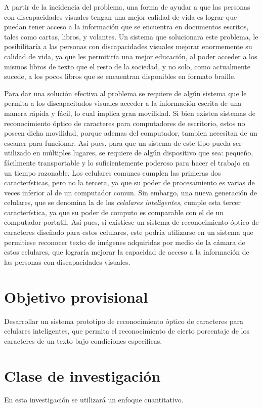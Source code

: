 \documentclass[a4paper, 11pt, oneside]{article}
\begin{document}
	A partir de la incidencia del problema, una forma de ayudar a que las personas con discapacidades visuales tengan una mejor calidad de vida es lograr que puedan tener acceso a la información que se encuentra en documentos escritos, tales como cartas, libros, y volantes. Un sistema que solucionara este problema, le posibilitaría a las personas con discapacidades visuales mejorar enormemente su calidad de vida, ya que les permitiría una mejor educación, al poder acceder a los mismos libros de texto que el resto de la sociedad, y no solo, como actualmente sucede, a los pocos libros que se encuentran disponibles en formato braille.

	Para dar una solución efectiva al problema se requiere de algún sistema que le permita a los discapacitados visuales acceder a la información escrita de una manera rápida y fácil, lo cual implica gran movilidad. Si bien existen sistemas de reconocimiento óptico de caracteres para computadores de escritorio, estos no poseen dicha movilidad, porque ademas del computador, tambien necesitan de un escaner para funcionar. Así pues, para que un sistema de este tipo pueda ser utilizado en múltiples lugares, se requiere de algún dispositivo que sea: pequeño, fácilmente transportable y lo suficientemente poderoso para hacer el trabajo en un tiempo razonable. Los celulares comunes cumplen las primeras dos características, pero no la tercera, ya que su poder de procesamiento es varias de veces inferior al de un computador comun. Sin embargo, una nueva generación de celulares, que se denomina la de los \textit{celulares inteligentes}, cumple esta tercer característica, ya que su poder de computo es comparable con el de un computador portatil. Así pues, si existiese un sistema de reconocimiento óptico de caracteres diseñado para estos celulares, este podría utilizarse en un sistema que permitiese reconocer texto de imágenes adquiridas por medio de la cámara de estos celulares, que lograría mejorar la capacidad de acceso a la información de las personas con discapacidades visuales.
	\clearpage
	\section{Objetivo provisional}
	Desarrollar un sistema prototipo de reconocimiento óptico de caracteres para celulares inteligentes, que permita el reconocimiento de cierto porcentaje de los caracteres de un texto bajo condiciones especificas.
	\clearpage
	\section{Clase de investigación}
	En esta investigación se utilizará un enfoque cuantitativo. 
	\clearpage
\end{document}
